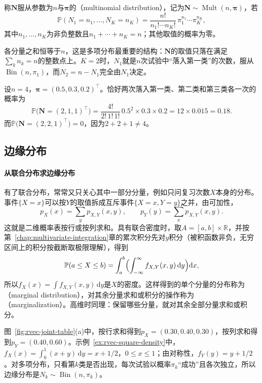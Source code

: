 \begin{definition}[多项分布]
称$\bm N$服从参数为$n$与$\bm\pi$的（multinomial distribution），记为$\bm N\sim\operatorname{Mult}(n,\bm\pi)$，若
\[
 \mathbb P(N_1=n_1,\ldots,N_K=n_K)=\frac{n!}{n_1!\cdots n_K!}\,\pi_1^{n_1}\cdots\pi_K^{n_K},
\]
其中$n_1,\ldots,n_K$为非负整数且$n_1+\cdots+n_K=n$；其他取值的概率为零。
\end{definition}

各分量之和恒等于$n$，这是多项分布最重要的结构：$\bm N$的取值只落在满足$\sum_kn_k=n$的整数点上。$K=2$时，$N_1$就是$n$次试验中“落入第一类”的次数，服从$\operatorname{Bin}(n,\pi_1)$，而$N_2=n-N_1$完全由$N_1$决定。

\begin{example}[三类结果的计数]
\label{ex:rvec-multinomial}
设$n=4$，$\bm\pi=(0.5,0.3,0.2)^{\top}$。恰好两次落入第一类、第二类和第三类各一次的概率为
\[
 \mathbb P\bigl(\bm N=(2,1,1)^{\top}\bigr)=\frac{4!}{2!\,1!\,1!}\,0.5^2\times0.3\times0.2=12\times0.015=0.18 .
\]
而$\mathbb P\bigl(\bm N=(2,2,1)^{\top}\bigr)=0$，因为$2+2+1\neq4$。
\end{example}

\subsection{边缘分布}

\paragraph{从联合分布求边缘分布}
有了联合分布，常常又只关心其中一部分分量，例如只问复习次数$X$本身的分布。事件$\{X=x\}$可以按$Y$的取值拆成互斥事件$\{X=x,Y=y\}$之并，由可加性，
\[
 p_X(x)=\sum_y p_{X,Y}(x,y),\qquad p_Y(y)=\sum_x p_{X,Y}(x,y).
\]
这就是二维概率表按行或按列求和。具有联合密度时，取$A=[a,b]\times\mathbb R$，并按第~\ref{chap:multivariate-integration}章的累次积分先对$y$积分（被积函数非负，无穷区间上的积分按截断取极限理解），得到
\[
 \mathbb P(a\le X\le b)=\int_a^b\Bigl(\int_{-\infty}^{\infty}f_{X,Y}(x,y)\,\mathrm dy\Bigr)\mathrm dx ,
\]
所以$f_X(x)=\int f_{X,Y}(x,y)\,\mathrm dy$是$X$的密度。这样得到的单个分量的分布称为（marginal distribution），对其余分量求和或积分的操作称为（marginalization）。高维时同理：保留哪些分量，就对其余全部分量求和或积分。

图~\ref{fig:rvec-joint-table}(a)中，按行求和得到$p_X=(0.30,0.40,0.30)$，按列求和得到$p_Y=(0.40,0.60)$。示例~\ref{ex:rvec-square-density}中，$f_X(x)=\int_0^1(x+y)\,\mathrm dy=x+1/2$，$0\le x\le1$；由对称性，$f_Y(y)=y+1/2$。对多项分布，只看第$k$类是否出现，每次试验以概率$\pi_k$“成功”且各次独立，所以边缘分布是$N_k\sim\operatorname{Bin}(n,\pi_k)$。

